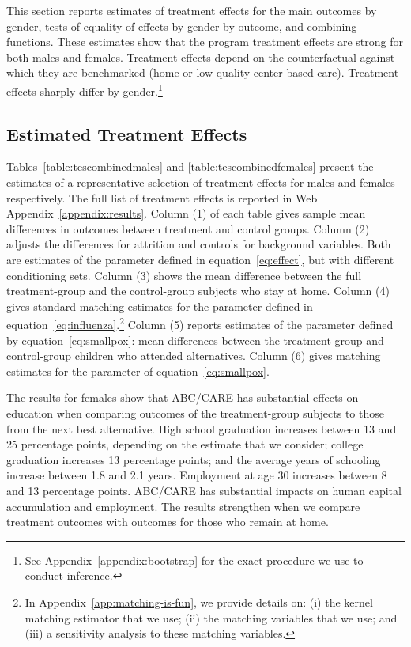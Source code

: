 This section reports estimates of treatment effects for the main outcomes by gender, tests of equality of effects by gender by outcome, and combining functions. These estimates show that the program treatment effects are strong for both males and females. Treatment effects depend on the counterfactual against which they are benchmarked (home or low-quality center-based care). Treatment effects sharply differ by gender.\footnote{See Appendix~\ref{appendix:bootstrap} for the exact procedure we use to conduct inference.}

\subsection{Estimated Treatment Effects}

Tables~\ref{table:tescombinedmales} and \ref{table:tescombinedfemales} present the estimates of a representative selection of treatment effects for males and females respectively. The full list of treatment effects is reported in Web Appendix~\ref{appendix:results}. Column (1) of each table gives sample mean differences in outcomes between treatment and control groups. Column (2) adjusts the differences for attrition and controls for background variables. Both are estimates of the parameter defined in equation~\eqref{eq:effect}, but with different conditioning sets. Column (3) shows the mean difference between the full treatment-group and the control-group subjects who stay at home. Column (4) gives standard matching estimates for the parameter defined in equation~\eqref{eq:influenza}.\footnote{In Appendix~\ref{app:matching-is-fun}, we provide details on: (i) the kernel matching estimator that we use; (ii) the matching variables that we use; and (iii) a sensitivity analysis to these matching variables.} Column (5) reports estimates of the parameter defined by equation~\eqref{eq:smallpox}: mean differences between the treatment-group and control-group children who attended alternatives. Column (6) gives matching estimates for the parameter of equation~\eqref{eq:smallpox}.

The results for females show that ABC/CARE has substantial effects on education when comparing outcomes of the treatment-group subjects to those from the next best alternative. High school graduation increases between 13 and 25 percentage points, depending on the estimate that we consider; college graduation increases 13 percentage points; and the average years of schooling increase between 1.8 and 2.1 years. Employment at age 30 increases between 8 and 13 percentage points. ABC/CARE has substantial impacts on human capital accumulation and employment. The results strengthen when we compare treatment outcomes with outcomes for those who remain at home.

